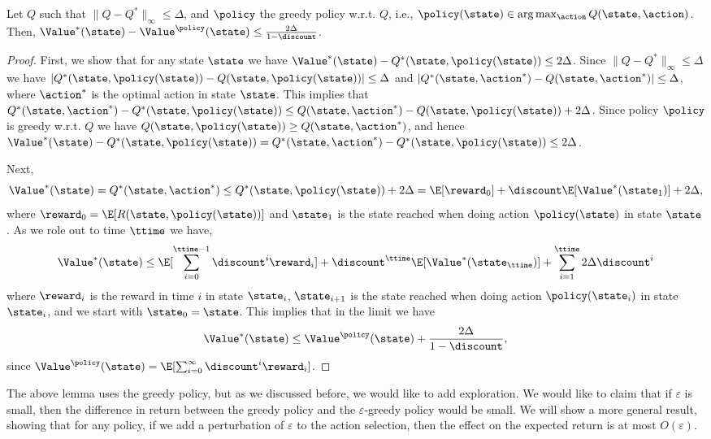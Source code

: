 \begin{lemma}
\label{lemma:Q-greedy-policy}
%
Let $Q$ such that $\| Q-Q^*\|_\infty \leq \Delta$, and $\policy$ the
greedy policy w.r.t. $Q$, i.e., $\policy(\state)\in \arg\max_\action
Q(\state,\action)$. Then,
$\Value^*(\state)-\Value^\policy(\state)\leq
\frac{2\Delta}{1-\discount}$.
\end{lemma}
\begin{proof}
First, we show that for any state $\state$ we have
$\Value^*(\state)-Q^*(\state,\policy(\state))\leq 2\Delta$. Since
$\| Q-Q^*\|_\infty \leq \Delta$ we have
$|Q^*(\state,\policy(\state))-Q(\state,\policy(\state))|\leq \Delta$
and $|Q^*(\state,\action^*)-Q(\state,\action^*)|\leq \Delta$, where
$\action^*$ is the optimal action in state $\state$. This implies that
%
$Q^*(\state,\action^*)-Q^*(\state,\policy(\state))\leq
Q(\state,\action^*)-Q(\state,\policy(\state))+2\Delta$.
%
Since policy $\policy$ is greedy w.r.t. $Q$ we have
$Q(\state,\policy(\state))\geq Q(\state,\action^*)$, and hence
$\Value^*(\state)-Q^*(\state,\policy(\state))=Q^*(\state,\action^*)-Q^*(\state,\policy(\state))\leq
2\Delta$.


Next,
$$\Value^*(\state)=Q^*(\state,\action^*)\leq Q^*(\state,\policy(\state))+2\Delta = \E[\reward_0]+\discount
\E[\Value^*(\state_1)]+2\Delta,$$ where
$\reward_0=\E[R(\state,\policy(\state))]$ and $\state_1$ is the state
reached when doing action $\policy(\state)$ in state $\state$. As we
role out to time $\ttime$ we have,
\[
\Value^*(\state)\leq \E[\sum_{i=0}^{\ttime-1} \discount^i
\reward_i]+\discount^\ttime
\E[\Value^*(\state_\ttime)]+\sum_{i=1}^\ttime 2\Delta\discount^i
\]
where $\reward_i$ is the reward in time $i$ in state $\state_i$,
$\state_{i+1}$ is the state reached when doing action
$\policy(\state_i)$ in state $\state_i$, and we start with
$\state_0=\state$.
%
This implies that in the limit we have
\[
\Value^*(\state)\leq \Value^\policy(\state)+\frac{
2\Delta}{1-\discount},
\]
since $\Value^\policy(\state)=\E[\sum_{i=0}^{\infty} \discount^i
\reward_i]$.
\end{proof}

The above lemma uses the greedy policy, but as we discussed before,
we would like to add exploration. We would like to claim that if
$\varepsilon$ is small, then the difference in return between the
greedy policy and the $\varepsilon$-greedy policy would be small. We
will show a more general result, showing that for any policy, if we
add a perturbation of $\varepsilon$ to the action selection, then
the effect on the expected return is at most $O(\varepsilon)$.

